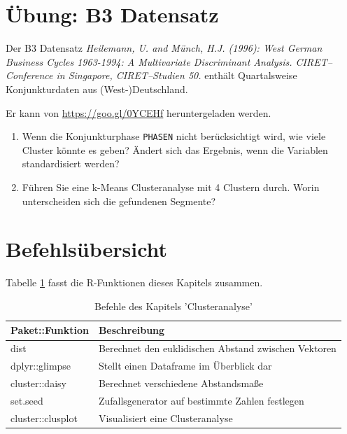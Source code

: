 \documentclass[12pt,ngerman,]{book}
\providecommand{\tightlist}{%
  \setlength{\itemsep}{0pt}\setlength{\parskip}{0pt}}
\begin{document}
\section{Übung: B3 Datensatz}\label{ubung-b3-datensatz}

Der B3 Datensatz \emph{Heilemann, U. and Münch, H.J. (1996): West German
Business Cycles 1963-1994: A Multivariate Discriminant Analysis.
CIRET--Conference in Singapore, CIRET--Studien 50.} enthält
Quartalsweise Konjunkturdaten aus (West-)Deutschland.

Er kann von \url{https://goo.gl/0YCEHf} heruntergeladen werden.

\begin{enumerate}
\def\labelenumi{\arabic{enumi}.}
\tightlist
\item
  Wenn die Konjunkturphase \texttt{PHASEN} nicht berücksichtigt wird,
  wie viele Cluster könnte es geben? Ändert sich das Ergebnis, wenn die
  Variablen standardisiert werden?
\item
  Führen Sie eine k-Means Clusteranalyse mit 4 Clustern durch. Worin
  unterscheiden sich die gefundenen Segmente?
\end{enumerate}

\section{Befehlsübersicht}\label{befehlsubersicht-10}

Tabelle \ref{tab:befehle-cluster} fasst die R-Funktionen dieses Kapitels
zusammen.

\begin{table}

\caption{\label{tab:befehle-cluster}Befehle des Kapitels 'Clusteranalyse'}
\centering
\begin{tabular}[t]{l|l}
\hline
Paket::Funktion & Beschreibung\\
\hline
dist & Berechnet den euklidischen Abstand zwischen Vektoren\\
\hline
dplyr::glimpse & Stellt einen Dataframe im Überblick dar\\
\hline
cluster::daisy & Berechnet verschiedene Abstandsmaße\\
\hline
set.seed & Zufallsgenerator auf bestimmte Zahlen festlegen\\
\hline
cluster::clusplot & Visualisiert eine Clusteranalyse\\
\hline
\end{tabular}
\end{table}
\end{document}
